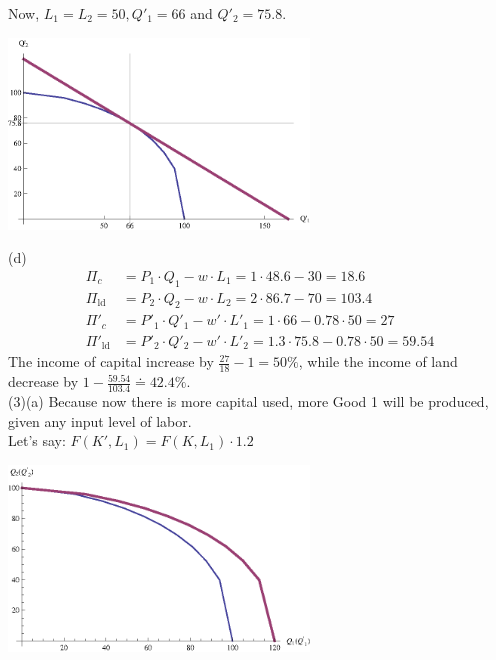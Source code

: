 \documentclass{article}
\begin{document}
\begin{description}
\begin{center}
            \end{center}
            Now, $L_1=L_2=50,Q'_1=66$ and $Q'_2=75.8$.\\
            \begin{center}
                    \includegraphics[angle=0, width=0.6\textwidth]{ECON3610A114}
            \end{center}
           (d)
           \begin{align}
           \Pi _c&=P_1\cdot Q_1-w\cdot L_1=1\cdot 48.6-30=18.6\\
           \Pi _{\text{ld}}&=P_2\cdot Q_2-w\cdot L_2=2\cdot 86.7-70=103.4\\
           \Pi '_c&=P'_1\cdot Q'_1-w'\cdot L'_1=1\cdot 66-0.78\cdot 50=27\\
           \Pi '_{\text{ld}}&=P'_2\cdot Q'_2-w'\cdot L'_2=1.3\cdot 75.8-0.78\cdot 50=59.54
            \end{align}
           The income of capital increase by $\frac{27}{18}-1=50\%$, while the income of land decrease by $1-\frac{59.54}{103.4}\doteq 42.4\%$.\\
        (3)(a)
            Because now there is more capital used, more Good 1 will be produced, given any input level of labor.\\
            Let's say: $F\left(K',L_1\right)=F\left(K,L_1\right)\cdot 1.2$\\
            \begin{center}
                    \includegraphics[angle=0, width=0.6\textwidth]{ECON3610A115}
            \end{center}

\end{description}
\end{document}
